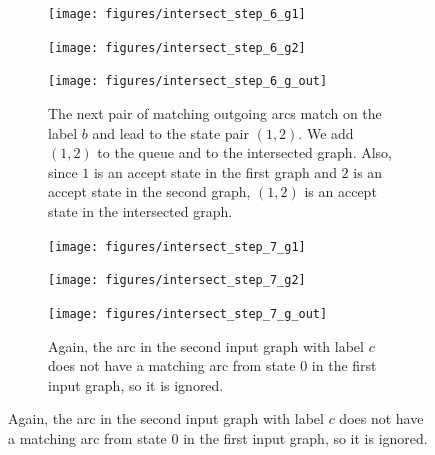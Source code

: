 \begin{figure}
\end{figure}

\begin{figure}\ContinuedFloat
    \begin{subfigure}{\linewidth}
        \begin{minipage}{0.22\textwidth}
            \centering
            \texttt{[image: figures/intersect\_step\_6\_g1]}
        \end{minipage}
        \begin{minipage}{0.37\textwidth}
            \centering
            \texttt{[image: figures/intersect\_step\_6\_g2]}
        \end{minipage}
        \begin{minipage}{0.37\textwidth}
            \centering
            \texttt{[image: figures/intersect\_step\_6\_g\_out]}
        \end{minipage}
        \caption{The next pair of matching outgoing arcs match on the label $b$
        and lead to the state pair $(1, 2)$. We add $(1, 2)$ to the queue and
        to the intersected graph. Also, since $1$ is an accept state in the
        first graph and $2$ is an accept state in the second graph, $(1, 2)$ is
        an accept state in the intersected graph.}
    \end{subfigure}

    \begin{subfigure}{\linewidth}
        \begin{minipage}{0.22\textwidth}
            \centering
            \texttt{[image: figures/intersect\_step\_7\_g1]}
        \end{minipage}
        \begin{minipage}{0.37\textwidth}
            \centering
            \texttt{[image: figures/intersect\_step\_7\_g2]}
        \end{minipage}
        \begin{minipage}{0.37\textwidth}
            \centering
            \texttt{[image: figures/intersect\_step\_7\_g\_out]}
        \end{minipage}
        \caption{Again, the arc in the second input graph with label $c$ does
        not have a matching arc from state $0$ in the first input graph, so it
        is ignored.}
    \end{subfigure}


\end{figure}
